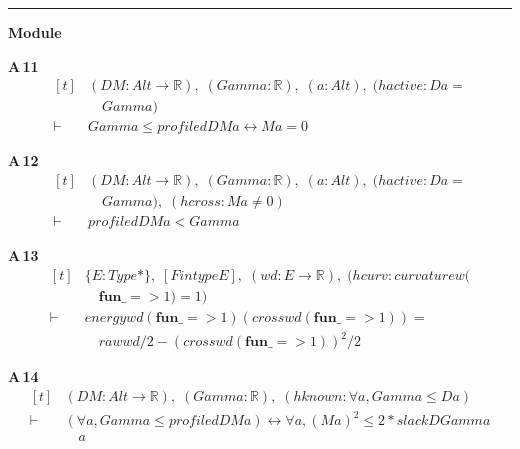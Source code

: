 \vspace{4pt}\noindent\rule{\columnwidth}{0.4pt}\par\vspace{2pt}
\noindent\textbf{Module }\par\vspace{3pt}

\noindent\textbf{A\,11}\quad{}
{\footnotesize\[ \begin{aligned}[t]
&(\mathit{D} \mathit{M} : \mathit{Alt} \to \mathbb{R} ),\; (\mathit{Gamma} : \mathbb{R} ),\; (\mathit{a} : \mathit{Alt}),\; (\mathit{hactive} : \mathit{D} \mathit{a} =\\
&\quad \mathit{Gamma})\\
\vdash\;&\mathit{Gamma} \leq \mathit{profiled} \mathit{D} \mathit{M} \mathit{a} \leftrightarrow \mathit{M} \mathit{a} = 0
\end{aligned} \]}

\noindent\textbf{A\,12}\quad{}
{\footnotesize\[ \begin{aligned}[t]
&(\mathit{D} \mathit{M} : \mathit{Alt} \to \mathbb{R} ),\; (\mathit{Gamma} : \mathbb{R} ),\; (\mathit{a} : \mathit{Alt}),\; (\mathit{hactive} : \mathit{D} \mathit{a} =\\
&\quad \mathit{Gamma}),\; (\mathit{hcross} : \mathit{M} \mathit{a} \neq 0)\\
\vdash\;&\mathit{profiled} \mathit{D} \mathit{M} \mathit{a} < \mathit{Gamma}
\end{aligned} \]}

\noindent\textbf{A\,13}\quad{}
{\footnotesize\[ \begin{aligned}[t]
&\{ \mathit{E} : \mathit{Type}*\},\; [\mathit{Fintype} \mathit{E}],\; (\mathit{w} \mathit{d} : \mathit{E} \to \mathbb{R} ),\; (\mathit{hcurv} : \mathit{curvature} \mathit{w} (\\
&\quad \mathbf{fun} \mathit{\_} => 1) = 1)\\
\vdash\;&\mathit{energy} \mathit{w} \mathit{d} (\mathbf{fun} \mathit{\_} => 1) (\mathit{cross} \mathit{w} \mathit{d} (\mathbf{fun} \mathit{\_} => 1)) =\\
&\quad \mathit{raw} \mathit{w} \mathit{d} / 2 - (\mathit{cross} \mathit{w} \mathit{d} (\mathbf{fun} \mathit{\_} => 1))^{2} / 2
\end{aligned} \]}

\noindent\textbf{A\,14}\quad{}
{\footnotesize\[ \begin{aligned}[t]
&(\mathit{D} \mathit{M} : \mathit{Alt} \to \mathbb{R} ),\; (\mathit{Gamma} : \mathbb{R} ),\; (\mathit{hknown} : \forall \mathit{a}, \mathit{Gamma} \leq \mathit{D} \mathit{a})\\
\vdash\;&(\forall \mathit{a}, \mathit{Gamma} \leq \mathit{profiled} \mathit{D} \mathit{M} \mathit{a}) \leftrightarrow \forall \mathit{a}, (\mathit{M} \mathit{a})^{2} \leq 2 * \mathit{slack} \mathit{D} \mathit{Gamma}\\
&\quad \mathit{a}
\end{aligned} \]}

